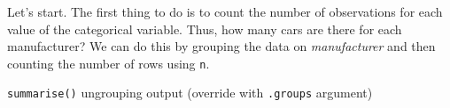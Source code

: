 \documentclass[]{tufte-book}
\newenvironment{Shaded}{}{}
\newcommand{\DataTypeTok}[1]{\textcolor[rgb]{0.56,0.13,0.00}{#1}}
\newcommand{\KeywordTok}[1]{\textcolor[rgb]{0.00,0.44,0.13}{\textbf{#1}}}
\newcommand{\NormalTok}[1]{#1}
\newcommand{\OperatorTok}[1]{\textcolor[rgb]{0.40,0.40,0.40}{#1}}
\newcommand{\StringTok}[1]{\textcolor[rgb]{0.25,0.44,0.63}{#1}}
\begin{document}
Let's start. The first thing to do is to count the number of observations for each value of the categorical variable. Thus, how many cars are there for each manufacturer? We can do this by grouping the data on \emph{manufacturer} and then counting the number of rows using \texttt{n}.

\begin{Shaded}
\end{Shaded}

\texttt{summarise()} ungrouping output (override with \texttt{.groups} argument)
\end{document}
